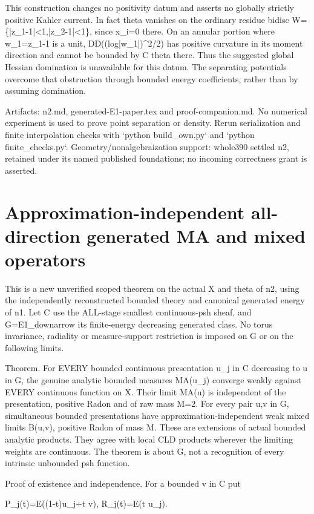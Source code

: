 \documentclass[11pt]{article}
\begin{document}
This construction changes no positivity datum and asserts no globally strictly positive Kahler current. In fact theta vanishes on the ordinary residue bidisc W=\{|z\_1-1|<1,|z\_2-1|<1\}, since x\_i=0 there. On an annular portion where w\_1=z\_1-1 is a unit, DD((log|w\_1|)\textasciicircum{}2/2) has positive curvature in its moment direction and cannot be bounded by C theta there. Thus the suggested global Hessian domination is unavailable for this datum. The separating potentials overcome that obstruction through bounded energy coefficients, rather than by assuming domination.

Artifacts: n2.md, generated-E1-paper.tex and proof-companion.md. No numerical experiment is used to prove point separation or density. Rerun serialization and finite interpolation checks with `python build\_own.py` and `python finite\_checks.py`. Geometry/nonalgebraization support: whole390 settled n2, retained under its named published foundations; no incoming correctness grant is asserted.


\section*{Approximation-independent all-direction generated MA and mixed operators}

This is a new unverified scoped theorem on the actual X and theta of n2, using the independently reconstructed bounded theory and canonical generated energy of n1. Let C use the ALL-stage smallest continuous-psh sheaf, and G=E1\_downarrow its finite-energy decreasing generated class. No torus invariance, radiality or measure-support restriction is imposed on G or on the following limits.

Theorem. For EVERY bounded continuous presentation u\_j in C decreasing to u in G, the genuine analytic bounded measures MA(u\_j) converge weakly against EVERY continuous function on X. Their limit MA(u) is independent of the presentation, positive Radon and of raw mass M=2. For every pair u,v in G, simultaneous bounded presentations have approximation-independent weak mixed limits B(u,v), positive Radon of mass M. These are extensions of actual bounded analytic products. They agree with local CLD products wherever the limiting weights are continuous. The theorem is about G, not a recognition of every intrinsic unbounded psh function.

Proof of existence and independence. For a bounded v in C put

P\_j(t)=E((1-t)u\_j+t v), R\_j(t)=E(t u\_j).
\end{document}
